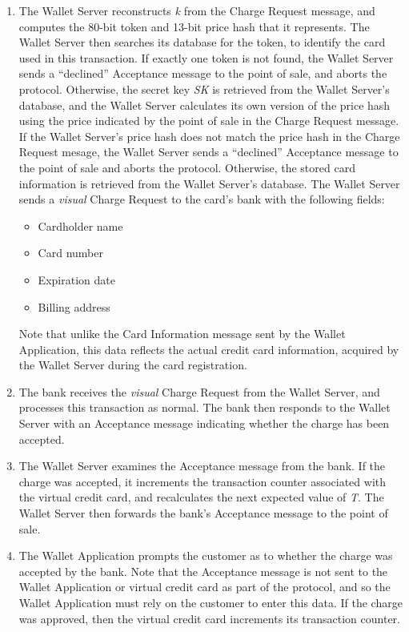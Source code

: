 \begin{enumerate}
\item The Wallet Server reconstructs \emph{k} from the Charge Request message, and computes the 80-bit token and 13-bit price hash that it represents.
    The Wallet Server then searches its database for the token, to identify the card used in this transaction.
    If exactly one token is not found, the Wallet Server sends a ``declined'' Acceptance message to the point of sale, and aborts the protocol.
    Otherwise, the secret key \emph{SK} is retrieved from the Wallet Server's database, and the Wallet Server calculates its own version of the price hash
        using the price indicated by the point of sale in the Charge Request message.
    If the Wallet Server's price hash does not match the price hash in the Charge Request mesage,
        the Wallet Server sends a ``declined'' Acceptance message to the point of sale and aborts the protocol.
    Otherwise, the stored card information is retrieved from the Wallet Server's database.
    The Wallet Server sends a \emph{visual} Charge Request to the card's bank with the following fields:
    \begin{itemize}
    \item Cardholder name
    \item Card number
    \item Expiration date
    \item Billing address
    \end{itemize}
    Note that unlike the Card Information message sent by the Wallet Application, this data reflects the actual credit card information,
        acquired by the Wallet Server during the card registration.

\item The bank receives the \emph{visual} Charge Request from the Wallet Server, and processes this transaction as normal.
    The bank then responds to the Wallet Server with an Acceptance message indicating whether the charge has been accepted.

\item The Wallet Server examines the Acceptance message from the bank.
    If the charge was accepted, it increments the transaction counter associated with the virtual credit card, and recalculates the next expected value of \emph{T}.
    The Wallet Server then forwards the bank's Acceptance message to the point of sale.

\item The Wallet Application prompts the customer as to whether the charge was accepted by the bank.
    Note that the Acceptance message is not sent to the Wallet Application or virtual credit card as part of the protocol,
        and so the Wallet Application must rely on the customer to enter this data.
    If the charge was approved, then the virtual credit card increments its transaction counter.
\end{enumerate}


